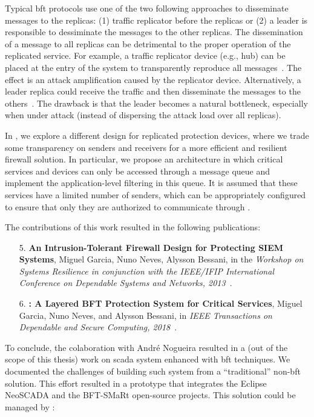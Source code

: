 Typical \gls{bft} protocols use one of the two following approaches to disseminate messages to the replicas: (1) traffic replicator before the replicas or (2) a leader is responsible to dessiminate the messages to the other replicas. 
The dissemination of a message to all replicas can be detrimental to the proper operation of the replicated service.
For example, a traffic replicator device (e.g., hub) can be placed at the entry of the system to transparently reproduce all messages~\cite{Sousa:2010,Roeder:2010}. 
The effect is an attack amplification caused by the replicator device.
Alternatively, a leader replica could receive the traffic and then disseminate the messages to the others~\cite{Amir:2011}.
The drawback is that the leader becomes a natural bottleneck, especially when under attack (instead of dispersing the attack load over all replicas).

In \sieveq, we explore a different design for replicated protection devices, where we trade some transparency on senders and receivers for a more efficient and resilient firewall solution.
In particular, we propose an architecture in which critical services and devices can only be accessed through a message queue and implement the application-level filtering in this queue.
It is assumed that these services have a limited number of senders, which can be appropriately configured to ensure that only they are authorized to communicate through \sieveq.



The contributions of this work resulted in the following publications:

\begin{enumerate}
\item[5.] \textbf{An Intrusion-Tolerant Firewall Design for Protecting SIEM Systems}, Miguel Garcia, Nuno Neves, Alysson Bessani, in the \emph{Workshop on Systems Resilience in conjunction with the IEEE/IFIP International Conference on Dependable Systems and Networks, 2013}~\cite{Garcia:2013}.

\item[6.] \textbf{\sieveq: A Layered BFT Protection System for Critical Services}, Miguel Garcia, Nuno Neves, and Alysson Bessani, in \emph{IEEE Transactions on Dependable and Secure Computing, 2018}~\cite{Garcia:2016}.
\end{enumerate}



To conclude, the colaboration with Andr\'{e} Nogueira resulted in a (out of the scope of this thesis) work on \gls{scada} system enhanced with \gls{bft} techniques. 
We documented the challenges of building such system from a ``traditional'' non-\gls{bft} solution.
This effort resulted in a prototype that integrates the Eclipse NeoSCADA and the BFT-SMaRt open-source projects.
This solution could be managed by \system:


